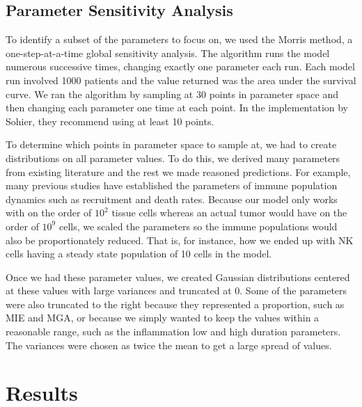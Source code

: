 \documentclass[11pt, preprint]{article}
\begin{document}
\subsection{Parameter Sensitivity Analysis}
To identify a subset of the parameters to focus on, we used the Morris method, a one-step-at-a-time global sensitivity analysis.
The algorithm runs the model numerous successive times, changing exactly one parameter each run\cite{morris1991factorial, sohier2014improvement}.
Each model run involved 1000 patients and the value returned was the area under the survival curve.
We ran the algorithm by sampling at 30 points in parameter space and then changing each parameter one time at each point.
In the implementation by Sohier, they recommend using at least 10 points\cite{sohier2014improvement}.

To determine which points in parameter space to sample at, we had to create distributions on all parameter values.
To do this, we derived many parameters from existing literature and the rest we made reasoned predictions.
For example, many previous studies have established the parameters of immune population dynamics such as recruitment and death rates\cite{de2014modeling}.
Because our model only works with on the order of $10^2$ tissue cells whereas an actual tumor would have on the order of $10^9$ cells\cite{de2014modeling}, we scaled the parameters so the immune populations would also be proportionately reduced.
That is, for instance, how we ended up with NK cells having a steady state population of 10 cells in the model.

Once we had these parameter values, we created Gaussian distributions centered at these values with large variances and truncated at 0.
Some of the parameters were also truncated to the right because they represented a proportion, such as MIE and MGA, or because we simply wanted to keep the values within a reasonable range, such as the inflammation low and high duration parameters.
The variances were chosen as twice the mean to get a large spread of values.

\section{Results}
\end{document}
